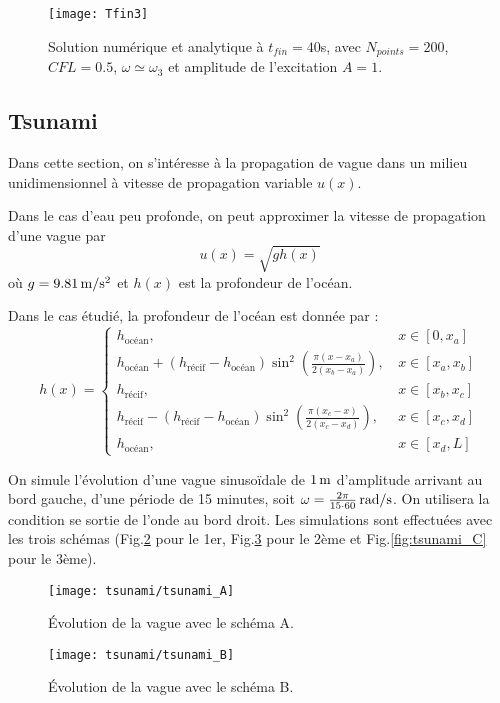 \documentclass[a4paper,12pt,oneside]{article}
\def \be {\begin{equation}}
\def \ee {\end{equation}}
\begin{document}
\begin{figure}[H]
    \centering
    \texttt{[image: Tfin3]}
    \caption{Solution numérique et analytique à $t_{fin}=40$s, avec $N_{points}=200$, $CFL=0.5$,  $\omega\simeq \omega_3$ et amplitude de l'excitation $A=1$.}
    \label{fig:Tfin3}
\end{figure}

\subsection{Tsunami}
Dans cette section, on s'intéresse à la propagation de vague dans un milieu unidimensionnel à vitesse de propagation variable $u(x)$.

Dans le cas d'eau peu profonde, on peut approximer la vitesse de propagation d'une vague par 
\be \label{eq:vitesse} u(x)=\sqrt{gh(x)} \ee
où $g=9.81 \, \rm m/s^2$ et $h(x)$ est la profondeur de l'océan.

Dans le cas étudié, la profondeur de l'océan est donnée par :
\be
h(x)=\left\{
\begin{array}{ll}
    h_\text{océan}, &  \, x \in [0,x_a] \\
    h_\text{océan}+(h_\text{récif}-h_\text{océan})\sin^2\left(\frac{\pi(x-x_a)}{2(x_b-x_a)} \right) , &  \, x \in [x_a,x_b] \\
    h_\text{récif}, &  \, x \in [x_b,x_c] \\
    h_\text{récif}-(h_\text{récif}-h_\text{océan})\sin^2\left(\frac{\pi(x_c-x)}{2(x_c-x_d)} \right) , &  \, x \in [x_c,x_d] \\
    h_\text{océan}, &  \, x \in [x_d,L]
\end{array}
\right.
\label{eq:Lambda}
\ee

On simule l'évolution d'une vague sinusoïdale de $1\, \rm m$ d'amplitude arrivant au bord gauche, d'une période de 15 minutes, soit $\omega=\frac{2 \pi}{15\cdot 60} \, \rm rad/s$. On utilisera la condition se sortie de l'onde au bord droit. Les simulations sont effectuées avec les trois schémas (Fig.\ref{fig:tsunami_A} pour le 1er, Fig.\ref{fig:tsunami_B} pour le 2ème et Fig.\ref{fig:tsunami_C} pour le 3ème).

\begin{figure}[H]
    \centering
    \texttt{[image: tsunami/tsunami\_A]}
    \caption{Évolution de la vague avec le schéma A.}
    \label{fig:tsunami_A}
\end{figure}

\begin{figure}[H]
    \centering
    \texttt{[image: tsunami/tsunami\_B]}
    \caption{Évolution de la vague avec le schéma B.}
    \label{fig:tsunami_B}
\end{figure}
\end{document}
